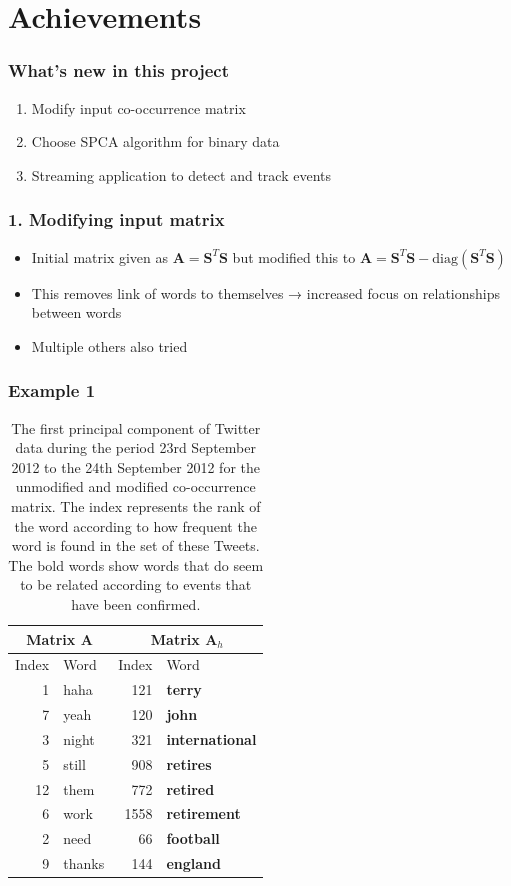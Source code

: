 \documentclass{beamer}
\begin{document}
\section{Achievements}
\begin{frame}
\frametitle{What's new in this project}
\begin{enumerate}
\item Modify input co-occurrence matrix
\item Choose SPCA algorithm for binary data
\item Streaming application to detect and track events
\end{enumerate}
\end{frame}

\begin{frame}
\frametitle{1. Modifying input matrix}
\begin{itemize}
\item Initial matrix given as	 $\mathbf{A}=\mathbf{S}^T\mathbf{S}$ but modified this to $\mathbf{A}=\mathbf{S}^T\mathbf{S} - \text{diag}(\mathbf{S}^T\mathbf{S})$ 
\item This removes link of words to themselves → increased focus on relationships between words
\item Multiple others also tried
\end{itemize}
\end{frame}

\begin{frame}
\frametitle{Example 1}
\begin{table}[H]
\center
\begin{tabular}{| r | l | r | l|}
\hline
\multicolumn{2}{|c|}{Matrix $\mathbf{A}$ }& \multicolumn{2}{|c|}{Matrix $\mathbf{A}_h$} \\
\hline
Index & Word &Index & Word \\
\hline
1 & haha & 121 & \textbf{terry}\\
7 & yeah  & 120 & \textbf{john} \\
3 & night&321 & \textbf{international} \\

5 & still & 908 & \textbf{retires}\\

12 & them& 772 & \textbf{retired}\\

6 & work& 1558 & \textbf{retirement} \\ 

2 & need &66 & \textbf{football} \\
 
9 & thanks& 144 & \textbf{england} \\

\hline
\end{tabular}
\caption{The first principal component of Twitter data during the period 23rd September 2012 to the 24th September 2012 for the unmodified and modified co-occurrence matrix. The index represents the rank of the word according to how frequent the word is found in the set of these Tweets. The bold words show words that do seem to be related according to events that have been confirmed.}
\label{pcs_jterry}
\end{table}
\end{frame}
\end{document}
